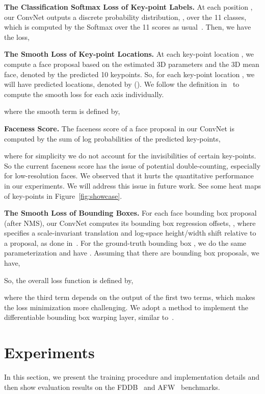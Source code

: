 \documentclass[runningheads]{llncs}
\begin{document}
\textbf{The Classification Softmax Loss of Key-point Labels.} At each position , our ConvNet outputs a discrete probability distribution, , over the 11 classes, which is computed by the Softmax over the 11 scores as usual~\cite{AlexNet}. Then, we have the loss,


\textbf{The Smooth  Loss of Key-point Locations.} At each key-point location , we compute a face proposal based on the estimated 3D parameters and the 3D mean face, denoted by  the predicted 10 keypoints. So, for each key-point location , we will have  predicted locations, denoted by  (). 
We follow the definition in~\cite{FastRCNN} to compute the smooth  loss for each axis individually.

where the smooth term is defined by,


\textbf{Faceness Score.} The faceness score of a face proposal in our ConvNet is computed by the sum of log probabilities of the predicted key-points,

where for simplicity we do not account for the invisibilities of certain key-points. So the current faceness score has the issue of potential double-counting, especially for low-resolution faces. We observed that it hurts the quantitative performance in our experiments. We will address this issue in future work. See some heat maps of key-points in Figure~\ref{fig:showcase}.

\textbf{The Smooth  Loss of Bounding Boxes.} For each face bounding box proposal  (after NMS), our ConvNet computes its bounding box regression offsets, , where  specifies a scale-invariant translation and log-space height/width shift relative to a proposal, as done in~\cite{FastRCNN,FasterRCNN}. For the ground-truth bounding box , we do the same parameterization and have . Assuming that there are  bounding box proposals, we have,


So, the overall loss function is defined by,

where the third term depends on the output of the first two terms, which makes the loss minimization more challenging.
We adopt a method to implement the differentiable bounding box warping layer, similar to~\cite{ResidualNetSeg}.

\section{Experiments} \label{sec:exp}

In this section, we present the training procedure and implementation details and then show evaluation results on the  FDDB~\cite{FDDB} and AFW~\cite{AFW} benchmarks.
\end{document}
